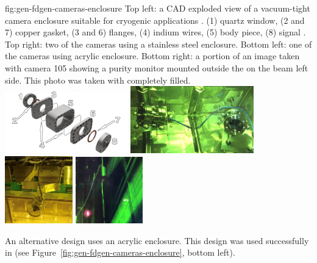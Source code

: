 \begin{dunefigure}{fig:gen-fdgen-cameras-enclosure}
  {Top left: a CAD exploded view of a vacuum-tight camera enclosure suitable for cryogenic applications \cite{Delaquis:2013hva}.
    (1) quartz window, (2 and 7) copper gasket, (3 and 6) flanges, (4) indium wires, (5) body piece, (8) signal \fdth.
    Top right: two of the  cameras using a stainless steel enclosure. 
    Bottom left: one of the  cameras using acrylic enclosure.
    Bottom right: a portion of an image taken with  camera 105 showing a purity monitor mounted outside the  on the beam left side. This photo was taken with  completely filled.
  }
  \includegraphics[width=0.4\textwidth]{graphics/exo100-camera-case}%
  \includegraphics[width=0.4\textwidth]{graphics/edgar-cameras}\\
  \hfill \includegraphics[width=0.22\textwidth]{graphics/bo-camera}%
  \hfill \includegraphics[width=0.22\textwidth]{graphics/camera-105-purmon-orig-rot-crop}%
  \hfill
\end{dunefigure}

An alternative design uses an acrylic enclosure.
This design was used successfully in  (see Figure~\ref{fig:gen-fdgen-cameras-enclosure}, bottom left).

